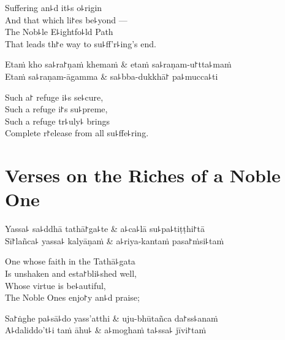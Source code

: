 \begin{english}
  Suffering an꜕d it꜕s o꜕rigin\\
  And that which li꜓es be꜕yond ---\\
  The Nob꜕le E꜕ightfo꜕ld Path\\
  That leads th꜓e way to su꜕ff'r꜕ing's end.
\end{english}

\begin{twochants}
  Etaṁ kho sa꜕ra꜓ṇaṁ khemaṁ & etaṁ sa꜕raṇam-u꜓tta꜕maṁ \\
  Etaṁ sa꜕raṇam-āgamma & sa꜕bba-dukkhā꜓ pa꜕mucca꜕ti \\
\end{twochants}

\begin{english}
  Such a꜓ refuge i꜕s se꜕cure,\\
  Such a refuge i꜓s su꜕preme,\\
  Such a refuge tr꜕uly꜕ brings\\
  Complete r꜓elease from all su꜕ffe꜕ring.
\end{english}

\chapter{Verses on the Riches of a Noble One}%


\begin{leader}
\end{leader}

\begin{twochants}
  Yassa꜕ sa꜕ddhā tathā꜓ga꜕te & a꜕ca꜕lā su꜕pa꜕tiṭṭhi꜓tā \\
  Sī꜓lañca꜕ yassa꜕ kalyāṇaṁ & a꜕riya-kantaṁ pasa꜓ṁsi꜕taṁ \\
\end{twochants}

\begin{english}
  One whose faith in the Tathā꜕gata\\
  Is unshaken and esta꜓bli꜕shed well,\\
  Whose virtue is be꜕autiful,\\
  The Noble Ones enjo꜓y an꜕d praise;
\end{english}

\begin{twochants}
  Sa꜓ṅghe pa꜕sā꜕do yass'atthi & uju-bhūtañca da꜓ss꜕anaṁ \\
  A꜕daliddo't꜕i taṁ āhu꜕ & a꜕moghaṁ ta꜕ssa꜕ jīvi꜓taṁ \\
\end{twochants}

